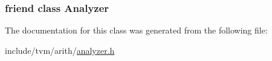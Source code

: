 \subsubsection[{\texorpdfstring{Analyzer}{Analyzer}}]{\setlength{\rightskip}{0pt plus 5cm}friend class {\bf Analyzer}\hspace{0.3cm}{\ttfamily [friend]}}\hypertarget{classtvm_1_1arith_1_1IntSetAnalyzer_a88d594816df596eed10643082b0d0805}{}\label{classtvm_1_1arith_1_1IntSetAnalyzer_a88d594816df596eed10643082b0d0805}


The documentation for this class was generated from the following file\+:\begin{DoxyCompactItemize}
\item 
include/tvm/arith/\hyperlink{analyzer_8h}{analyzer.\+h}\end{DoxyCompactItemize}
